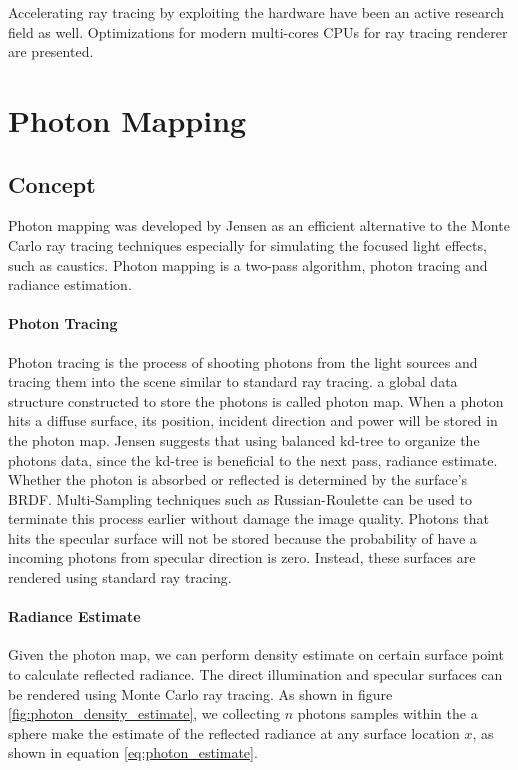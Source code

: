 Accelerating ray tracing by exploiting the hardware have been an active research field as well. Optimizations for modern multi-cores CPUs for ray tracing renderer are presented\cite{Wald:2002:IGI:581896.581899}. 

\section{Photon Mapping}

\subsection{Concept} 

Photon mapping was developed by Jensen \cite{HenrikWannJensen2004} as an efficient alternative to the Monte Carlo ray tracing techniques especially for simulating the focused light effects, such as caustics. Photon mapping is a two-pass algorithm, photon tracing and radiance estimation. 

\paragraph{Photon Tracing} 
Photon tracing is the process of shooting photons from the light sources and tracing them into the scene similar to standard ray tracing. a global data structure constructed to store the photons is called photon map. When a photon hits a diffuse surface, its position, incident direction and power will be stored in the photon map. Jensen suggests that using balanced kd-tree \cite{Bentley:1975:MBS:361002.361007} to organize the photons data, since the kd-tree is beneficial to the next pass, radiance estimate. Whether the photon is absorbed or reflected is determined by the surface's BRDF. Multi-Sampling techniques such as Russian-Roulette\cite{Neulander:2011:AIS:2037826.2037876} can be used to terminate this process earlier without damage the image quality. Photons that hits the specular surface will not be stored because the probability of have a incoming photons from specular direction is zero. Instead, these surfaces are rendered using standard ray tracing. 

\paragraph{Radiance Estimate}
Given the photon map, we can perform density estimate on certain surface point to calculate reflected radiance. The direct illumination and specular surfaces can be rendered using Monte Carlo ray tracing. As shown in figure \ref{fig:photon_density_estimate}, we collecting \(n\) photons samples within the a sphere make the estimate of the reflected radiance at any surface location \(x\), as shown in equation \ref{eq:photon_estimate}. 

